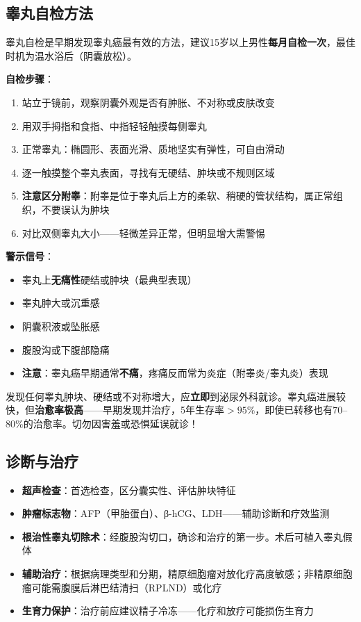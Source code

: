 \documentclass[12pt,a4paper,twoside]{ctexbook}
\begin{document}
\subsection{睾丸自检方法}

睾丸自检是早期发现睾丸癌最有效的方法，建议15岁以上男性\textbf{每月自检一次}，最佳时机为温水浴后（阴囊放松）。

\textbf{自检步骤}：
\begin{enumerate}
	\item 站立于镜前，观察阴囊外观是否有肿胀、不对称或皮肤改变
	\item 用双手拇指和食指、中指轻轻触摸每侧睾丸
	\item 正常睾丸：椭圆形、表面光滑、质地坚实有弹性，可自由滑动
	\item 逐一触摸整个睾丸表面，寻找有无硬结、肿块或不规则区域
	\item \textbf{注意区分附睾}：附睾是位于睾丸后上方的柔软、稍硬的管状结构，属正常组织，不要误认为肿块
	\item 对比双侧睾丸大小——轻微差异正常，但明显增大需警惕
\end{enumerate}

\textbf{警示信号}：
\begin{itemize}[leftmargin=2cm]
	\item 睾丸上\textbf{无痛性}硬结或肿块（最典型表现）
	\item 睾丸肿大或沉重感
	\item 阴囊积液或坠胀感
	\item 腹股沟或下腹部隐痛
	\item \textbf{注意}：睾丸癌早期通常\textbf{不痛}，疼痛反而常为炎症（附睾炎/睾丸炎）表现
\end{itemize}

\begin{tcolorbox}[colback=pink!5!white,colframe=red!50!black,title=贴心小叮咛]
发现任何睾丸肿块、硬结或不对称增大，应\textbf{立即}到泌尿外科就诊。睾丸癌进展较快，但\textbf{治愈率极高}——早期发现并治疗，5年生存率$>95\%$，即使已转移也有$70$--$80\%$的治愈率。切勿因害羞或恐惧延误就诊！
\end{tcolorbox}

\subsection{诊断与治疗}

\begin{itemize}[leftmargin=2cm]
	\item \textbf{超声检查}：首选检查，区分囊实性、评估肿块特征
	\item \textbf{肿瘤标志物}：AFP（甲胎蛋白）、β-hCG、LDH——辅助诊断和疗效监测
	\item \textbf{根治性睾丸切除术}：经腹股沟切口，确诊和治疗的第一步。术后可植入睾丸假体
	\item \textbf{辅助治疗}：根据病理类型和分期，精原细胞瘤对放化疗高度敏感；非精原细胞瘤可能需腹膜后淋巴结清扫（RPLND）或化疗
	\item \textbf{生育力保护}：治疗前应建议精子冷冻——化疗和放疗可能损伤生育力
\end{itemize}
\end{document}

